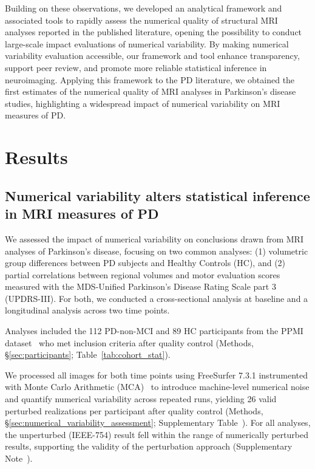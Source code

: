 Building on these observations, we developed an analytical framework and
associated tools to rapidly assess the numerical quality of structural MRI
analyses reported in the published literature, opening the possibility to
conduct large-scale impact evaluations of numerical variability. By making
numerical variability evaluation accessible, our framework and tool enhance
transparency, support peer review, and promote more reliable statistical
inference in neuroimaging. Applying this framework to the PD literature, we
obtained the first estimates of the numerical quality of MRI analyses in
Parkinson's disease studies, highlighting a widespread impact of numerical
variability on MRI measures of PD.\@

\section{Results}

\subsection{Numerical variability alters statistical inference in MRI measures
    of PD\label{sec:empirical_evaluation}}

We assessed the impact of numerical variability on conclusions drawn from MRI
analyses of Parkinson's disease, focusing on two common analyses: (1)
volumetric group differences between PD subjects and Healthy Controls (HC), and
(2) partial correlations between regional volumes and motor evaluation scores
measured with the MDS-Unified Parkinson's Disease Rating Scale part 3
(UPDRS-III). For both, we conducted a cross-sectional analysis at baseline and
a longitudinal analysis across two time points.

Analyses included the 112 PD-non-MCI and 89 HC participants from the PPMI
dataset~\cite{marek2011parkinson} who met inclusion criteria after quality
control (Methods, \S\ref{sec:participants}; Table~\ref{tab:cohort_stat}).

We processed all images for both time points using FreeSurfer 7.3.1
instrumented with Monte Carlo Arithmetic (MCA)~\cite{parker1997monte} to
introduce machine-level numerical noise and quantify numerical variability
across repeated runs, yielding 26 valid perturbed realizations per participant
after quality control (Methods, \S\ref{sec:numerical_variability_assessment};
Supplementary Table~). For all analyses, the
unperturbed (IEEE-754) result fell within the range of numerically perturbed
results, supporting the validity of the perturbation approach (Supplementary
Note~).

